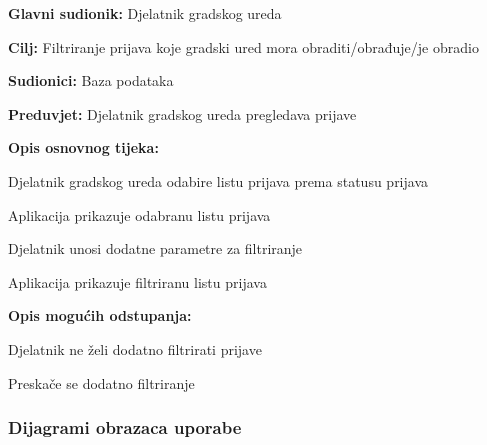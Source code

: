 				
				\noindent {}
				\begin{packed_item}
					
					\item \textbf{Glavni sudionik:} Djelatnik gradskog ureda
					\item  \textbf{Cilj:} Filtriranje prijava koje gradski ured mora obraditi/obrađuje/je obradio
					\item  \textbf{Sudionici:} Baza podataka
					\item  \textbf{Preduvjet:} Djelatnik gradskog ureda pregledava prijave
					
					\item  \textbf{Opis osnovnog tijeka:}
					\item[] \begin{packed_enum}
						\item Djelatnik gradskog ureda odabire listu prijava prema statusu prijava
						\item Aplikacija prikazuje odabranu listu prijava
						\item Djelatnik unosi dodatne parametre za filtriranje
						\item Aplikacija prikazuje filtriranu listu prijava
					\end{packed_enum}
					
					\item  \textbf{Opis mogućih odstupanja:}
					\item[] \begin{packed_item}
						\item[3.a] Djelatnik ne želi dodatno filtrirati prijave
						\item[] \begin{packed_enum}
							\item Preskače se dodatno filtriranje
						\end{packed_enum}
					\end{packed_item}
				\end{packed_item}
				
				\eject
					
				\subsubsection{Dijagrami obrazaca uporabe}
					

